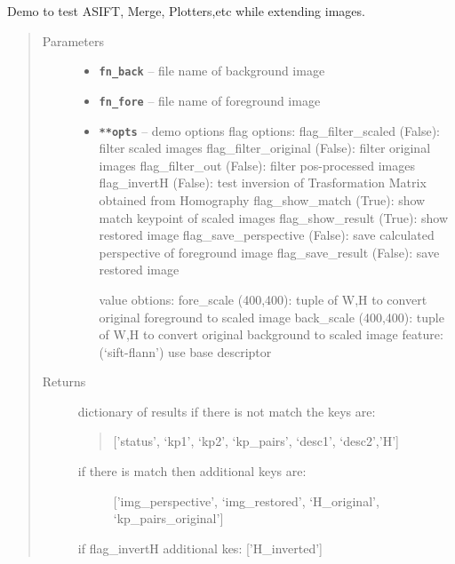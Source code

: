 \documentclass[letterpaper,10pt,english]{sphinxmanual}
\begin{document}

\begin{fulllineitems}
\label{RRtoolbox.tools:RRtoolbox.tools.restoration.asif_demo2}
Demo to test ASIFT, Merge, Plotters,etc while extending images.
\begin{quote}\begin{description}
\item[{Parameters}] \leavevmode\begin{itemize}
\item {} 
\textbf{\texttt{fn\_back}} -- file name of background image

\item {} 
\textbf{\texttt{fn\_fore}} -- file name of foreground image

\item {} 
\textbf{\texttt{**opts}} -- 
demo options
flag options:
flag\_filter\_scaled (False): filter scaled images
flag\_filter\_original (False): filter original images
flag\_filter\_out (False): filter pos-processed images
flag\_invertH (False): test inversion of Trasformation Matrix obtained from Homography
flag\_show\_match (True): show match keypoint of scaled images
flag\_show\_result (True): show restored image
flag\_save\_perspective (False): save calculated perspective of foreground image
flag\_save\_result (False): save restored image

value obtions:
fore\_scale (400,400): tuple of W,H to convert original foreground to scaled image
back\_scale (400,400): tuple of W,H to convert original background to scaled image
feature: (`sift-flann') use base descriptor


\end{itemize}

\item[{Returns}] \leavevmode

dictionary of results
if there is not match the keys are:
\begin{quote}

{[}'status', `kp1', `kp2', `kp\_pairs', `desc1', `desc2','H'{]}
\end{quote}
\begin{description}
\item[{if there is match then additional keys are:}] \leavevmode
{[}'img\_perspective', `img\_restored', `H\_original', `kp\_pairs\_original'{]}

\end{description}

if flag\_invertH additional kes: {[}'H\_inverted'{]}


\end{description}\end{quote}

\end{fulllineitems}
\end{document}
